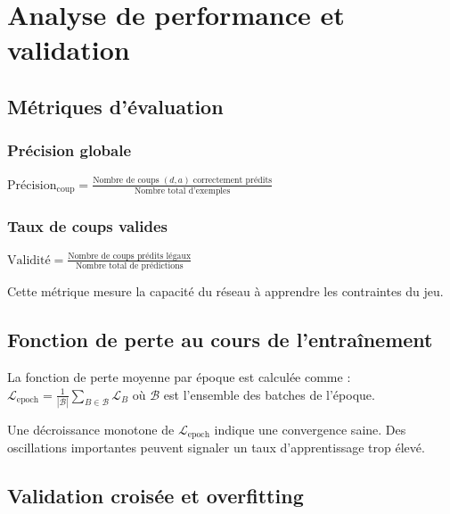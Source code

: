 \documentclass[12pt,a4paper]{report}
\numberwithin{equation}{section}
\begin{document}

\chapter{Analyse de performance et validation}

\section{Métriques d'évaluation}

\subsection{Précision globale}
$\text{Précision}_{\text{coup}} = \frac{\text{Nombre de coups }(d,a)\text{ correctement prédits}}{\text{Nombre total d'exemples}}$

\subsection{Taux de coups valides}
$\text{Validité} = \frac{\text{Nombre de coups prédits légaux}}{\text{Nombre total de prédictions}}$

Cette métrique mesure la capacité du réseau à apprendre les contraintes du jeu.

\section{Fonction de perte au cours de l'entraînement}

La fonction de perte moyenne par époque est calculée comme :
$\mathcal{L}_{\text{epoch}} = \frac{1}{|\mathcal{B}|} \sum_{B \in \mathcal{B}} \mathcal{L}_B$
où $\mathcal{B}$ est l'ensemble des batches de l'époque.

\begin{remark}
Une décroissance monotone de $\mathcal{L}_{\text{epoch}}$ indique une convergence saine. Des oscillations importantes peuvent signaler un taux d'apprentissage trop élevé.
\end{remark}

\section{Validation croisée et overfitting}
\end{document}
